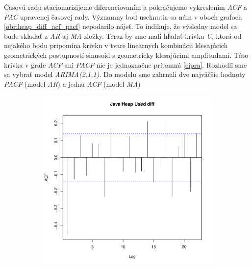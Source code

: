 \documentclass[12pt,a4paper,oneside,final]{article}
\theoremstyle{definition}
\theoremstyle{remark}
\numberwithin{equation}{section}
\begin{document}
Časovú radu stacionarizijeme diferenciovaním a pokračujeme vykreslením \emph{ACF} a
\emph{PAC} upravenej časovej rady. 
Významny bod useknutia sa nám v oboch grafoch \ref{obr:heap_diff_acf_pacf} nepodarilo nájsť. 
To indikuje, že výsledny 
model sa bude skladať z \emph{AR} aj \emph{MA} zložky. Teraz by sme mali hľadať krivku 
\emph{U}, ktorá od nejakého bodu pripomína krivku v tvare linearnych kombinácii klesajúcich
geometrických postupností sinusoid s geometricky klesajúcimi amplitudami.
Túto krivka v grafe \emph{ACF} ani \emph{PACF} nie je jednoznačne prítomná \ref{cipra}. 
Rozhodli sme sa vybrať model \emph{ARIMA(2,1,1)}. Do modelu sme zahrnuli dve najväčšie 
hodnoty \emph{PACF} (model \emph{AR}) a jednu \emph{ACF} (model \emph{MA})

\begin{figure}[H] \centering
    \begin{subfigure}[b]{0.45\textwidth}
        \centering
        \includegraphics[width=1\linewidth]{images/heap_diff_acf.pdf}
    \end{subfigure}
    \begin{subfigure}[b]{0.45\textwidth}
        \centering

\end{subfigure}
\end{figure}
\end{document}
